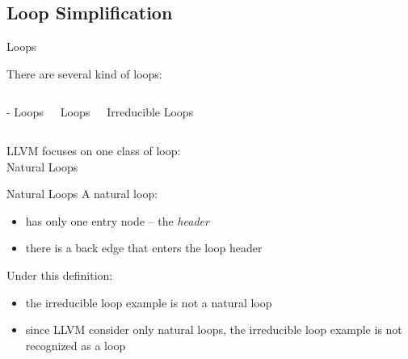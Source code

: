 \subsection{Loop Simplification}


\begin{frame}{Loops}
\begin{center}
There are several kind of loops:

\begin{columns}[t]
\begin{block}{- Loops}
\centering

\end{block}

\begin{block}{ Loops}
\centering

\end{block}

\begin{block}{Irreducible Loops}
\centering

\end{block}
\end{columns}

\bigskip
LLVM focuses on one class of loop:\\
\alert{Natural Loops}
\end{center}
\end{frame}


\begin{frame}{Natural Loops}
A natural loop:

\begin{itemize}
\item has only one entry node -- the \emph{header}
\item there is a back edge that enters the loop header
\end{itemize}

\vfill
Under this definition:

\begin{itemize}
\item the irreducible loop example is not a natural loop
\item since LLVM consider only natural loops, the irreducible loop example \alert{is not
      recognized} as a loop
\end{itemize}
\end{frame}


